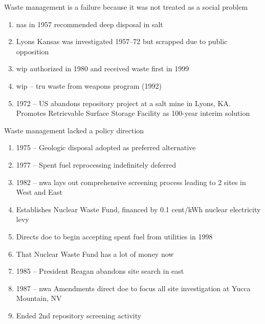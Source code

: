 \documentclass[aspectratio=1610,pdftex,dvipsnames,compress,xcolor={dvipsnames}]{beamer}
\newcommand{\acs}{\acrshort} %
\begin{document}
\begin{frame}{Waste management is a failure because it was not treated as a social problem}
    \begin{enumerate}[series=outerlist,topsep=0pt,itemsep=21pt,leftmargin=*,label=(\arabic*)]
        \item[]\acs{nas} in 1957 recommended deep disposal in salt 
        \item[]Lyons Kansas was investigated 1957--72 but scrapped due to public opposition
        \item[]\acs{wip} authorized in 1980 and received waste first in 1999
        \item[]\acs{wip} -- \acs{tru} waste from weapons program (1992)
        \item[]1972 -- US abandons repository project at a salt mine in Lyons, KA. Promotes Retrievable Surface Storage Facility as 100-year interim solution
    \end{enumerate}
\end{frame}


\begin{frame}{Waste management lacked a policy direction}
    \begin{enumerate}[series=outerlist,topsep=0pt,itemsep=11pt,leftmargin=*,label=(\arabic*)]
        \item[]1975 -- Geologic disposal adopted as preferred alternative
        \item[]1977 -- Spent fuel reprocessing indefinitely deferred
        \item[]1982 -- \acs{nwa} lays out comprehensive screening process leading to 2 sites in West and East
        \item[]Establishes Nuclear Waste Fund, financed by 0.1 cent/kWh nuclear electricity levy
        \item[]Directs \acs{doe} to begin accepting spent fuel from utilities in 1998
        \item[]That Nuclear Waste Fund has a lot of money now
        \item[]1985 -- President Reagan abandons site search in east
        \item[]1987 -- \acs{nwa} Amendments direct \acs{doe} to focus all site investigation at Yucca Mountain, NV
        \item[]Ended 2nd repository screening activity
    \end{enumerate}
\end{frame}
\end{document}
